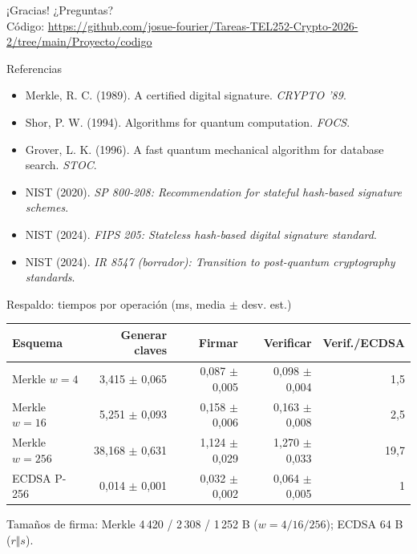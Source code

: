 \documentclass[aspectratio=169,11pt]{beamer}
\begin{document}
\begin{frame}
  \centering
  {\Large ¡Gracias! ¿Preguntas?}\\[1.5em]
  \scriptsize Código: \url{https://github.com/josue-fourier/Tareas-TEL252-Crypto-2026-2/tree/main/Proyecto/codigo}
\end{frame}

\begin{frame}{Referencias}
  \scriptsize
  \begin{itemize}
    \item Merkle, R. C. (1989). A certified digital signature. \emph{CRYPTO '89}.
    \item Shor, P. W. (1994). Algorithms for quantum computation. \emph{FOCS}.
    \item Grover, L. K. (1996). A fast quantum mechanical algorithm for database search. \emph{STOC}.
    \item NIST (2020). \emph{SP 800-208: Recommendation for stateful hash-based signature schemes}.
    \item NIST (2024). \emph{FIPS 205: Stateless hash-based digital signature standard}.
    \item NIST (2024). \emph{IR 8547 (borrador): Transition to post-quantum cryptography standards}.
  \end{itemize}
\end{frame}

\appendix
\begin{frame}{Respaldo: tiempos por operación (ms, media $\pm$ desv. est.)}
  \centering
  \small
  \begin{tabular}{lrrrr}
    \toprule
    Esquema & Generar claves & Firmar & Verificar & Verif./ECDSA \\
    \midrule
    Merkle $w=4$   & 3,415 $\pm$ 0,065  & 0,087 $\pm$ 0,005 & 0,098 $\pm$ 0,004 & 1,5 \\
    Merkle $w=16$  & 5,251 $\pm$ 0,093  & 0,158 $\pm$ 0,006 & 0,163 $\pm$ 0,008 & 2,5 \\
    Merkle $w=256$ & 38,168 $\pm$ 0,631 & 1,124 $\pm$ 0,029 & 1,270 $\pm$ 0,033 & 19,7 \\
    ECDSA P-256    & 0,014 $\pm$ 0,001  & 0,032 $\pm$ 0,002 & 0,064 $\pm$ 0,005 & 1 \\
    \bottomrule
  \end{tabular}
  \vspace{1em}

  \small Tamaños de firma: Merkle 4\,420 / 2\,308 / 1\,252 B ($w=4/16/256$); ECDSA 64 B ($r\Vert s$).
\end{frame}
\end{document}
